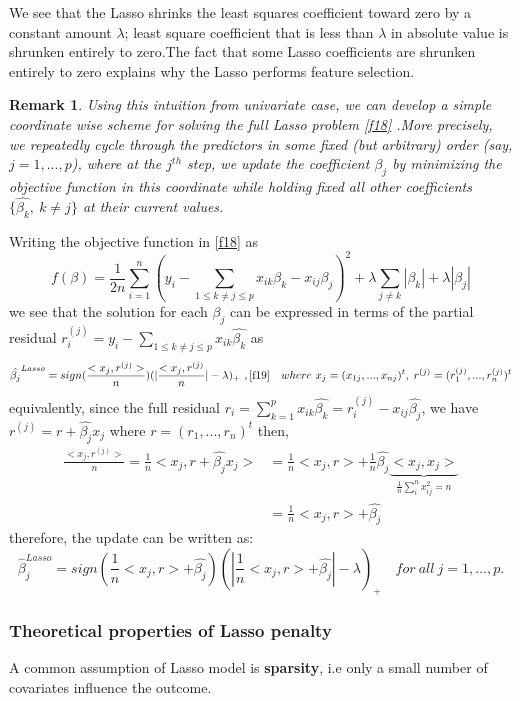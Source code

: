 \documentclass[12pt]{report}
\newtheorem{remarque}{Remark}[section]
\begin{document}
	
	We see that the Lasso shrinks the least squares coefficient toward zero by a constant amount $\lambda$; least square coefficient that is less than $\lambda$ in absolute value is shrunken entirely to zero.The fact that some Lasso coefficients are shrunken entirely to zero explains why the Lasso performs feature selection.
	\begin{remarque}
		Using this intuition from univariate case, we can develop a simple \textit{coordinate wise} scheme for solving the full Lasso problem \eqref{f18} .More precisely, we repeatedly cycle  through the predictors in some fixed (but arbitrary) order (say, $j=1,...,p$), where at the $j^{th}$ step, we update the coefficient $\beta_{j}$ by minimizing the objective function  in this coordinate while holding fixed all other coefficients $\{\hat{\beta_{k}}, \ k \neq j\}$ at their current values.
	\end{remarque}
	Writing the objective function in \eqref{f18} as 
	$$f(\beta)=\frac{1}{2n}\sum_{i=1}^{n}(y_{i}-\sum_{1\leq k\neq j \leq p}x_{ik}\beta_{k}-x_{ij}\beta_{j})^{2}+\lambda \sum_{j\neq k}|\beta_{k}|+\lambda|\beta_{j}|$$
	we see that the solution for each $\beta_{j}$ can be expressed in terms of the partial residual $r_{i}^{(j)}=y_{i}-\sum_{1\leq k\neq j \leq p}x_{ik}\hat{\beta_{k}}$ as
	$$ \hat{\beta_{j}}^{Lasso}=sign(\frac{<x_{j},r^{(j)}>}{n})( |\frac{<x_{j},r^{(j)}}{n}|-\lambda)_{+}\ ,\eqref{f19}\quad where\  x_{j}=(x_{1j},...,x_{nj})^{t},\; r^{(j)}=(r_{1}^{(j)},...,r_{n}^{(j)})^{t}$$
	equivalently, since the full residual $r_{i}=\sum_{k=1}^{p}x_{ik}\hat{\beta_{k}}=r_{i}^{(j)}-x_{ij}\hat{\beta_{j}}$, we have $r^{(j)}=r +\hat{\beta_{j}}x_{j}$ where $ r=(r_{1},...,r_{n})^{t}$ then,
	\begin{align*}
		\frac{<x_{j},r^{(j)}>}{n}=\frac{1}{n}<x_{j},r +\hat{\beta_{j}}x_{j}>&=\frac{1}{n}<x_{j},r>+\frac{1}{n}\hat{\beta_{j}}\underbrace{<x_{j},x_{j}>}_{\frac{1}{n}\sum_{i}^{n}x_{ij}^{2}=n}\\
		&=\frac{1}{n}<x_{j},r>+\hat{\beta_{j}}
	\end{align*}
	therefore, the update can be written as:
	\begin{equation}
		\hat{\beta}_{j}^{Lasso}=sign(\frac{1}{n}<x_{j},r>+\hat{\beta_{j}})( |\frac{1}{n}<x_{j},r>+\hat{\beta_{j}}|-\lambda)_{+}\quad for\ all\ j=1,...,p.
	\end{equation}
	\subsubsection{Theoretical properties of Lasso penalty}
	\label{tpl}
A common assumption of Lasso model is \textbf{sparsity}, i.e only a small number of covariates influence the outcome.
\end{document}
